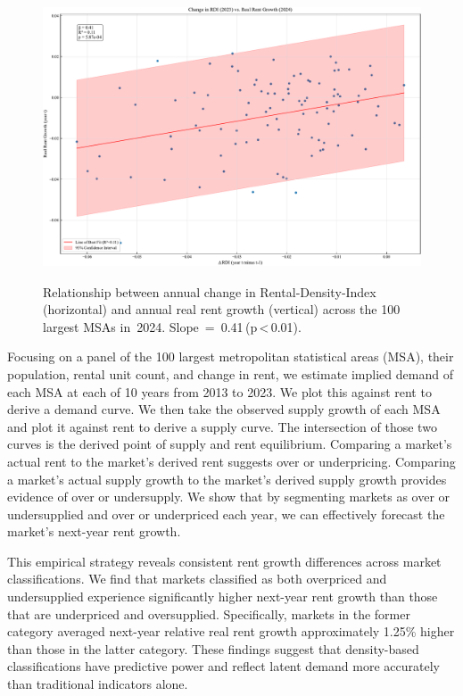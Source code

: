 \documentclass[APA,Times1COL]{WileyNJDv5} %
\begin{document}
\begin{figure}[htb!]
	\centerline{\includegraphics[height=20pc]{rdi_rent_growth_2024.pdf}}
	\caption{Relationship between annual change in Rental‑Density‑Index (horizontal) and annual real rent growth (vertical) across the 100 largest MSAs in 2024. Slope = 0.41 (p < 0.01).\label{fig:rdi_national}}
\end{figure}

Focusing on a panel of the 100 largest metropolitan statistical areas (MSA), their population, rental unit count, and change in rent, we estimate implied demand of each MSA at each of 10 years from 2013 to 2023. We plot this against rent to derive a demand curve. We then take the observed supply growth of each MSA and plot it against rent to derive a supply curve. The intersection of those two curves is the derived point of supply and rent equilibrium. Comparing a market's actual rent to the market's derived rent suggests over or underpricing. Comparing a market's actual supply growth to the market's derived supply growth provides evidence of over or undersupply. We show that by segmenting markets as over or undersupplied and over or underpriced each year, we can effectively forecast the market's next-year rent growth.  

This empirical strategy reveals consistent rent growth differences across market classifications. We find that markets classified as both overpriced and undersupplied experience significantly higher next-year rent growth than those that are underpriced and oversupplied. Specifically, markets in the former category averaged next-year relative real rent growth approximately 1.25\% higher than those in the latter category. These findings suggest that density-based classifications have predictive power and reflect latent demand more accurately than traditional indicators alone.
\end{document}
